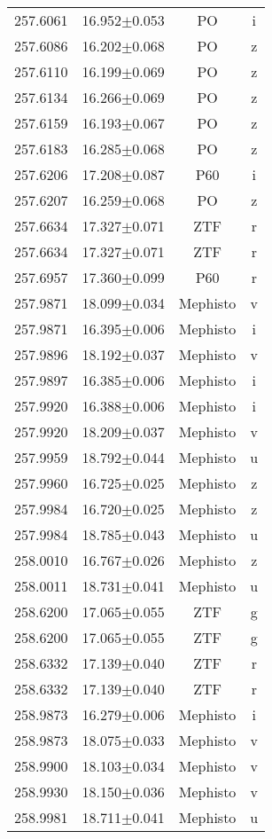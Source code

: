 \begin{table}
\begin{tabular}{cccc}
257.6061 & 16.952$\pm$0.053 & PO & i \\
257.6086 & 16.202$\pm$0.068 & PO & z \\
257.6110 & 16.199$\pm$0.069 & PO & z \\
257.6134 & 16.266$\pm$0.069 & PO & z \\
257.6159 & 16.193$\pm$0.067 & PO & z \\
257.6183 & 16.285$\pm$0.068 & PO & z \\
257.6206 & 17.208$\pm$0.087 & P60 & i \\
257.6207 & 16.259$\pm$0.068 & PO & z \\
257.6634 & 17.327$\pm$0.071 & ZTF & r \\
257.6634 & 17.327$\pm$0.071 & ZTF & r \\
257.6957 & 17.360$\pm$0.099 & P60 & r \\
257.9871 & 18.099$\pm$0.034 & Mephisto & v \\
257.9871 & 16.395$\pm$0.006 & Mephisto & i \\
257.9896 & 18.192$\pm$0.037 & Mephisto & v \\
257.9897 & 16.385$\pm$0.006 & Mephisto & i \\
257.9920 & 16.388$\pm$0.006 & Mephisto & i \\
257.9920 & 18.209$\pm$0.037 & Mephisto & v \\
257.9959 & 18.792$\pm$0.044 & Mephisto & u \\
257.9960 & 16.725$\pm$0.025 & Mephisto & z \\
257.9984 & 16.720$\pm$0.025 & Mephisto & z \\
257.9984 & 18.785$\pm$0.043 & Mephisto & u \\
258.0010 & 16.767$\pm$0.026 & Mephisto & z \\
258.0011 & 18.731$\pm$0.041 & Mephisto & u \\
258.6200 & 17.065$\pm$0.055 & ZTF & g \\
258.6200 & 17.065$\pm$0.055 & ZTF & g \\
258.6332 & 17.139$\pm$0.040 & ZTF & r \\
258.6332 & 17.139$\pm$0.040 & ZTF & r \\
258.9873 & 16.279$\pm$0.006 & Mephisto & i \\
258.9873 & 18.075$\pm$0.033 & Mephisto & v \\
258.9900 & 18.103$\pm$0.034 & Mephisto & v \\
258.9930 & 18.150$\pm$0.036 & Mephisto & v \\
258.9981 & 18.711$\pm$0.041 & Mephisto & u \\

\end{tabular}
\end{table}

